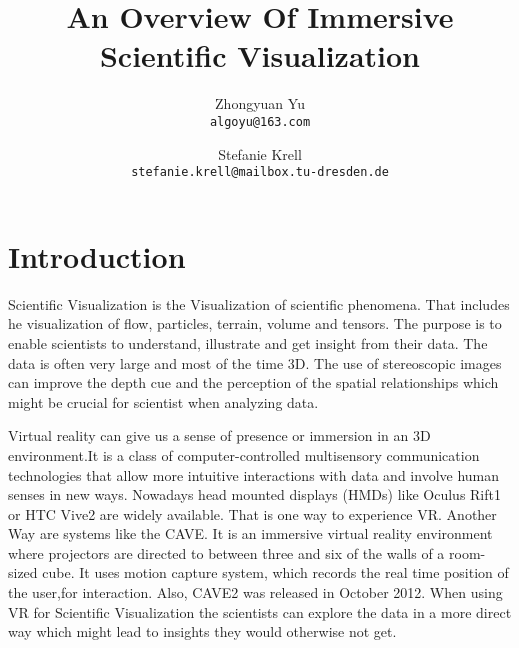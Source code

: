 \documentclass[10pt,twocolumn,letterpaper]{article}
\begin{document}
\title{An Overview Of Immersive Scientific Visualization}

\author{Zhongyuan Yu\\
{\tt\small algoyu@163.com}
\and
Stefanie Krell\\
{\tt\small stefanie.krell@mailbox.tu-dresden.de}
}

\maketitle


\section{Introduction}

Scientific Visualization is the Visualization of scientific phenomena. That includes he visualization of flow, particles, terrain, volume and tensors. The purpose is to enable scientists to understand, illustrate and get insight from their data. The data is often very large and most of the time 3D.  The use of stereoscopic images can improve the depth cue and the perception of the spatial relationships which might be crucial for scientist when analyzing data.


\setlength{\parindent}{1pc}
Virtual reality can give us a sense of presence or immersion in an 3D environment.It is a class of computer-controlled multisensory communication technologies that allow more intuitive interactions with data and involve human senses in new ways. Nowadays head mounted displays
(HMDs) like Oculus Rift1 or HTC Vive2 are widely available. That is one way to experience VR. Another Way are systems like the CAVE. It is an immersive virtual reality environment where projectors are directed to between three and six of the walls of a room-sized cube. It uses motion capture system, which records the real time position of the user,for interaction. Also, CAVE2 was released in October 2012. When using VR for Scientific Visualization the scientists can explore the data in a more direct way which might lead to insights they would otherwise not get. 
\end{document}
